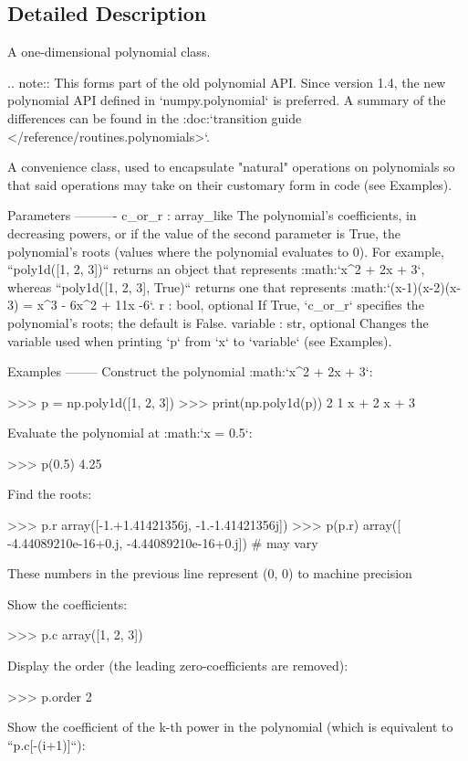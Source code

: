 \subsection{Detailed Description}
\begin{DoxyVerb}A one-dimensional polynomial class.

.. note::
   This forms part of the old polynomial API. Since version 1.4, the
   new polynomial API defined in `numpy.polynomial` is preferred.
   A summary of the differences can be found in the
   :doc:`transition guide </reference/routines.polynomials>`.

A convenience class, used to encapsulate "natural" operations on
polynomials so that said operations may take on their customary
form in code (see Examples).

Parameters
----------
c_or_r : array_like
    The polynomial's coefficients, in decreasing powers, or if
    the value of the second parameter is True, the polynomial's
    roots (values where the polynomial evaluates to 0).  For example,
    ``poly1d([1, 2, 3])`` returns an object that represents
    :math:`x^2 + 2x + 3`, whereas ``poly1d([1, 2, 3], True)`` returns
    one that represents :math:`(x-1)(x-2)(x-3) = x^3 - 6x^2 + 11x -6`.
r : bool, optional
    If True, `c_or_r` specifies the polynomial's roots; the default
    is False.
variable : str, optional
    Changes the variable used when printing `p` from `x` to `variable`
    (see Examples).

Examples
--------
Construct the polynomial :math:`x^2 + 2x + 3`:

>>> p = np.poly1d([1, 2, 3])
>>> print(np.poly1d(p))
   2
1 x + 2 x + 3

Evaluate the polynomial at :math:`x = 0.5`:

>>> p(0.5)
4.25

Find the roots:

>>> p.r
array([-1.+1.41421356j, -1.-1.41421356j])
>>> p(p.r)
array([ -4.44089210e-16+0.j,  -4.44089210e-16+0.j]) # may vary

These numbers in the previous line represent (0, 0) to machine precision

Show the coefficients:

>>> p.c
array([1, 2, 3])

Display the order (the leading zero-coefficients are removed):

>>> p.order
2

Show the coefficient of the k-th power in the polynomial
(which is equivalent to ``p.c[-(i+1)]``):


\end{DoxyVerb}
